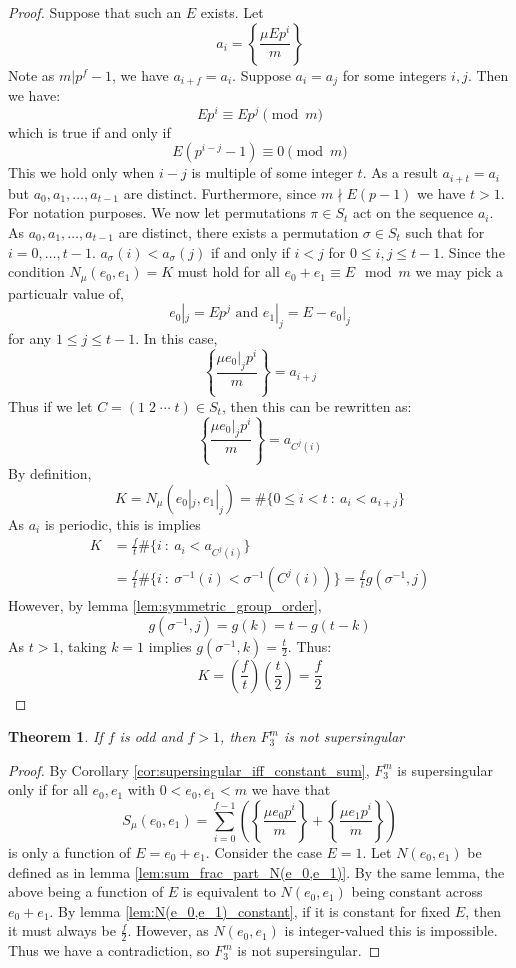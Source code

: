 \documentclass{article}
\newtheorem{theorem}{Theorem}[section]
\theoremstyle{definition}
\theoremstyle{definition}
\theoremstyle{remark}
\begin{document}
\begin{proof}
Suppose that such an $E$ exists. Let
\[a_i = \left\{ \frac{\mu Ep^i}{m}\right\}\]
Note as $m | p^f - 1$, we have $a_{i + f} = a_i$. Suppose $a_i = a_j$ for some integers $i,j$. Then we have:
\[Ep^{i} \equiv Ep^{j} \pmod{m}\]
which is true if and only if
\[E(p^{i-j} - 1) \equiv 0 \pmod{m}\]
This we hold only when $i - j$ is multiple of some integer $t$. As a result $a_{i+t} = a_i$ but $a_0, a_1, \ldots, a_{t-1}$ are distinct. Furthermore, since $m \nmid E(p-1)$ we have $t > 1$. For notation purposes. We now let permutations $\pi \in S_{t}$ act on the sequence $a_i$. As $a_0, a_1, \ldots, a_{t-1}$ are distinct, there exists a permutation $\sigma \in S_t$ such that 
for $i = 0, \ldots, t - 1$. $a_\sigma(i) < a_\sigma(j)$ if and only if $i < j$ for $0 \le i,j \le t-1$. Since the condition $N_\mu(e_0, e_1) = K$ must hold for all $e_0 + e_1 \equiv E \mod{m}$ we may pick a particualr value of,
\[ e_0 |_j = E p^j \text{ and } e_1 |_j = E - e_0|_j \] 
for any $1 \le j \le t - 1$. In this case,
\[\left\{ \frac{\mu e_0|_j p^i}{m}\right\} = a_{i + j}\]
Thus if we let $C = (1 \; 2 \; \cdots \; t) \in S_t$, then this can be rewritten as:
\[\left\{ \frac{\mu e_0|_j p^i}{m}\right\} = a_{C^j(i)}\]
By definition,
\begin{equation*}
K = N_\mu( e_0 |_j ,  e_1 |_j ) = \# \{ 0 \le i < t \ : \ a_i < a_{i + j} \}
\end{equation*}
As $a_i$ is periodic, this is implies
\begin{align*}
K &= \frac{f}{t}\#\{i \ : \ a_i < a_{C^j(i)}\} \\
& = \frac{f}{t}\#\{ i \ : \ \sigma^{-1}(i) < \sigma^{-1}(C^j(i)) \} = \frac{f}{t} g(\sigma^{-1}, j)
\end{align*}
However, by lemma \ref{lem:symmetric_group_order},
\[ g(\sigma^{-1}, j) = g(k) = t - g(t - k) \]
As $t > 1$, taking $k = 1$ implies $g(\sigma^{-1}, k) = \frac{t}{2}$. Thus:
\[K = \left(\frac{f}{t}\right)\left(\frac{t}{2}\right) = \frac{f}{2}\]
\end{proof}

\begin{theorem} \label{thm:shioda_neg1}
If $f$ is odd and $f > 1$, then $F^m_3$ is not supersingular
\end{theorem}
\begin{proof}
By Corollary \ref{cor:supersingular_iff_constant_sum}, $F^m_3$ is supersingular only if for all $e_0, e_1$ with $0 < e_0, e_1 < m$ we have that 
\[ S_\mu(e_0, e_1) = \sum_{i = 0}^{f-1} \left( \left\{\frac{\mu e_0p^i}{m}\right\} + \left\{\frac{\mu e_1p^i}{m}\right\} \right) \]
is only a function of $E = e_0 + e_1$. Consider the case $E = 1$. Let $N(e_0, e_1)$ be defined as in lemma \ref{lem:sum_frac_part_N(e_0,e_1)}. By the same lemma, the above being a function of $E$ is equivalent to $N(e_0, e_1)$ being constant across $e_0 + e_1$. By lemma \ref{lem:N(e_0,e_1)_constant}, if it is constant for fixed $E$, then it must always be $\frac{f}{2}$. However, as $N(e_0, e_1)$ is integer-valued this is impossible. Thus we have a contradiction, so $F^m_3$ is not supersingular.
\end{proof}
\end{document}
